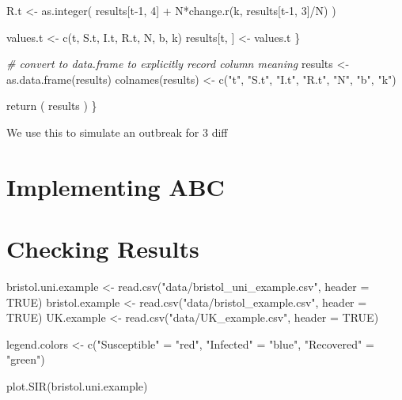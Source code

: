 \documentclass[
]{article}
\newenvironment{Shaded}{\begin{snugshade}}{\end{snugshade}}
\newcommand{\AttributeTok}[1]{\textcolor[rgb]{0.77,0.63,0.00}{#1}}
\newcommand{\CommentTok}[1]{\textcolor[rgb]{0.56,0.35,0.01}{\textit{#1}}}
\newcommand{\ConstantTok}[1]{\textcolor[rgb]{0.00,0.00,0.00}{#1}}
\newcommand{\DecValTok}[1]{\textcolor[rgb]{0.00,0.00,0.81}{#1}}
\newcommand{\FunctionTok}[1]{\textcolor[rgb]{0.00,0.00,0.00}{#1}}
\newcommand{\NormalTok}[1]{#1}
\newcommand{\OtherTok}[1]{\textcolor[rgb]{0.56,0.35,0.01}{#1}}
\newcommand{\SpecialCharTok}[1]{\textcolor[rgb]{0.00,0.00,0.00}{#1}}
\newcommand{\StringTok}[1]{\textcolor[rgb]{0.31,0.60,0.02}{#1}}
\begin{document}
\begin{Shaded}
\begin{Highlighting}[]
\NormalTok{    R.t }\OtherTok{\textless{}{-}} \FunctionTok{as.integer}\NormalTok{( results[t}\DecValTok{{-}1}\NormalTok{, }\DecValTok{4}\NormalTok{] }\SpecialCharTok{+}\NormalTok{ N}\SpecialCharTok{*}\FunctionTok{change.r}\NormalTok{(k,    results[t}\DecValTok{{-}1}\NormalTok{, }\DecValTok{3}\NormalTok{]}\SpecialCharTok{/}\NormalTok{N) )}
    
\NormalTok{    values.t     }\OtherTok{\textless{}{-}} \FunctionTok{c}\NormalTok{(t, S.t, I.t, R.t, N, b, k)}
\NormalTok{    results[t, ] }\OtherTok{\textless{}{-}}\NormalTok{ values.t}
\NormalTok{  \}}
  
  \CommentTok{\# convert to data.frame to explicitly record column meaning}
\NormalTok{  results           }\OtherTok{\textless{}{-}} \FunctionTok{as.data.frame}\NormalTok{(results)}
  \FunctionTok{colnames}\NormalTok{(results) }\OtherTok{\textless{}{-}} \FunctionTok{c}\NormalTok{(}\StringTok{"t"}\NormalTok{, }\StringTok{"S.t"}\NormalTok{, }\StringTok{"I.t"}\NormalTok{, }\StringTok{"R.t"}\NormalTok{, }\StringTok{"N"}\NormalTok{, }\StringTok{"b"}\NormalTok{, }\StringTok{"k"}\NormalTok{)}
  
  \FunctionTok{return}\NormalTok{ ( results )}
\NormalTok{\}}
\end{Highlighting}
\end{Shaded}

We use this to simulate an outbreak for 3 diff

\hypertarget{implementing-abc}{%
\section{Implementing ABC}\label{implementing-abc}}

\hypertarget{checking-results}{%
\section{Checking Results}\label{checking-results}}

\begin{Shaded}
\begin{Highlighting}[]
\NormalTok{bristol.uni.example }\OtherTok{\textless{}{-}} \FunctionTok{read.csv}\NormalTok{(}\StringTok{"data/bristol\_uni\_example.csv"}\NormalTok{, }\AttributeTok{header =} \ConstantTok{TRUE}\NormalTok{)}
\NormalTok{bristol.example     }\OtherTok{\textless{}{-}} \FunctionTok{read.csv}\NormalTok{(}\StringTok{"data/bristol\_example.csv"}\NormalTok{, }\AttributeTok{header =} \ConstantTok{TRUE}\NormalTok{)}
\NormalTok{UK.example          }\OtherTok{\textless{}{-}} \FunctionTok{read.csv}\NormalTok{(}\StringTok{"data/UK\_example.csv"}\NormalTok{, }\AttributeTok{header =} \ConstantTok{TRUE}\NormalTok{)}

\NormalTok{legend.colors }\OtherTok{\textless{}{-}} \FunctionTok{c}\NormalTok{(}\StringTok{"Susceptible"} \OtherTok{=} \StringTok{"red"}\NormalTok{, }\StringTok{"Infected"} \OtherTok{=} \StringTok{"blue"}\NormalTok{, }\StringTok{"Recovered"} \OtherTok{=} \StringTok{"green"}\NormalTok{)}

\FunctionTok{plot.SIR}\NormalTok{(bristol.uni.example)}
\end{Highlighting}
\end{Shaded}
\end{document}
